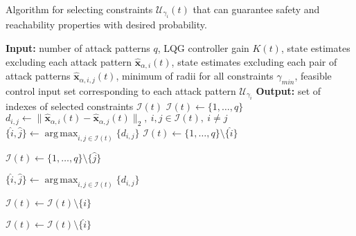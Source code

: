 \documentclass[journal]{IEEEtran}
\DeclareMathOperator*{\argmax}{arg\,max}
\begin{document}
\begin{algorithm}[h]
	\caption{Algorithm for selecting constraints $\mathcal{U}_{\gamma_i}(t)$ that can guarantee safety and reachability properties with desired probability.}
	\label{algo:control-policy}
	\begin{algorithmic}[1]
 		\State \textbf{Input: }number of attack patterns $q$, LQG controller gain $K(t)$, state estimates excluding each attack pattern $\hat{\mathbf{x}}_{\alpha,i}(t)$, state estimates excluding each pair of attack patterns $\hat{\mathbf{x}}_{\alpha,i,j}(t)$, minimum of radii for all constraints $\gamma_{min}$, feasible control input set corresponding to each attack pattern $\mathcal{U}_{\gamma_i}$
 		\State \textbf{Output: }set of indexes of selected constraints $\mathcal{I}(t)$
 		\State $\mathcal{I}(t) \leftarrow \{1,\ldots,q\}$
 		\State $d_{i,j} \leftarrow \|\hat{\mathbf{x}}_{\alpha,i}(t) - \hat{\mathbf{x}}_{\alpha,j}(t)\|_2, \ i,j\in\mathcal{I}(t), \ i\neq j$
 		\State $\{\hat{i}, \hat{j}\} \leftarrow \argmax_{i,j \in \mathcal{I}(t)} \{d_{i,j}\}$
                \State $\mathcal{I}(t) \leftarrow \{1,\ldots,q\} \setminus \{\hat{i}\}$
            \EndIf
            
                \State $\mathcal{I}(t) \leftarrow \{1,\ldots,q\} \setminus \{\hat{j}\}$
            \EndIf
            
            \State $\{\hat{i}, \hat{j}\} \leftarrow \argmax_{i,j \in \mathcal{I}(t)} \{d_{i,j}\}$
        \EndWhile
            
 
 		            \State $\mathcal{I}(t) \leftarrow \mathcal{I}(t) \setminus \{i\}$
 		        \EndIf
 		            
 		            \State $\mathcal{I}(t) \leftarrow \mathcal{I}(t) \setminus \{\hat{i}\}$
 		        \EndIf
 		    \EndIf
 		    
 		  

\end{algorithmic}
\end{algorithm}
\end{document}
